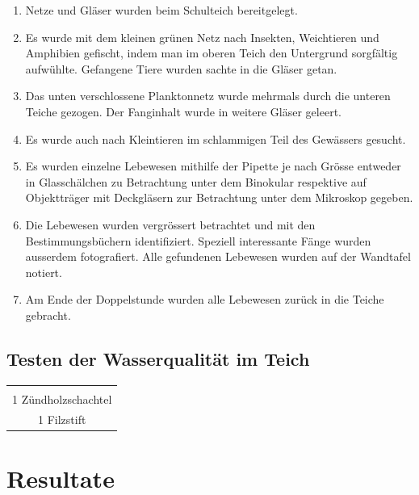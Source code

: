 \documentclass{article}
\begin{document}
        \begin{enumerate}
            \item Netze und Gläser wurden beim Schulteich bereitgelegt.
            \item Es wurde mit dem kleinen grünen Netz nach Insekten, Weichtieren und Amphibien gefischt, indem man im oberen Teich den Untergrund sorgfältig aufwühlte. Gefangene Tiere wurden sachte in die Gläser getan.
            \item Das unten verschlossene Planktonnetz wurde mehrmals durch die unteren Teiche gezogen. Der Fanginhalt wurde in weitere Gläser geleert.
            \item Es wurde auch nach Kleintieren im schlammigen Teil des Gewässers gesucht.
            \item Es wurden einzelne Lebewesen mithilfe der Pipette je nach Grösse entweder in Glasschälchen zu Betrachtung unter dem Binokular respektive auf Objektträger mit Deckgläsern zur Betrachtung unter dem Mikroskop gegeben.
            \item Die Lebewesen wurden vergrössert betrachtet und mit den Bestimmungsbüchern identifiziert. Speziell interessante Fänge wurden ausserdem fotografiert. Alle gefundenen Lebewesen wurden auf der Wandtafel notiert.
            \item Am Ende der Doppelstunde wurden alle Lebewesen zurück in die Teiche gebracht.
        \end{enumerate}
        
    \subsection{Testen der Wasserqualität im Teich}
    
        \begin{table}[h!]
        \centering
        \begin{tabular}{|c|} 
         \hline
         \\
         1 Zündholzschachtel \\
         1 Filzstift \\[1ex]
         \hline
        \end{tabular}
        \label{Praktikum1}
        \end{table}

    

\section{Resultate}
\end{document}
